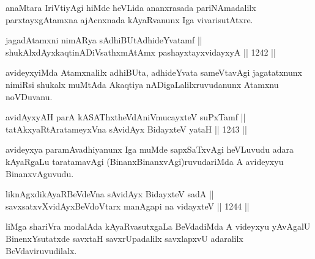 \begin{artha}
anaMtara IriVtiyAgi hiMde heVLida ananxrasada pariNAmadalilx parxtayxgAtamxna ajAcnxnada kAyaRvanunx Iga vivarisutAtxre.
\end{artha}


\begin{shl}
jagadAtamxni nimARya sAdhiBUtAdhideYvatamf || \\
shukAlxdAyxkaqtinADiVsathxmAtAmx pashayxtayxvidayxyA \hfill || 1242 ||  
\end{shl}

\begin{artha}
avideyxyiMda Atamxnalilx adhiBUta, adhideYvata sameVtavAgi jagatatxnunx nimiRsi shukalx muMtAda Akaqtiya nADigaLalilxruvudanunx Atamxnu noVDuvanu.
\end{artha}


\begin{shl}
\footnotemark[1]avidAyxyAH parA kASAThx\s theVdAniVmucayxteV suPxTamf || \\
tatAkxyaRtAratameyxVna sA\s vidAyx BidayxteV yataH \hfill || 1243 ||  
\end{shl}

\begin{artha}
avideyxya paramAvadhiyanunx Iga muMde sapxSaTxvAgi heVLuvudu adara kAyaRgaLu taratamavAgi (BinanxBinanxvAgi)ruvudariMda A avideyxyu BinanxvAguvudu.
\end{artha}


\begin{shl}
liknAgxdikAyaRBeVdeVna sA\s vidAyx BidayxteV sadA || \\
savxsatxvXvidAyxBeVdoV\s tarx manAgapi na vidayxteV \hfill || 1244 ||  
\end{shl}

\begin{artha}
liMga shariVra modalAda kAyaRvasutxgaLa BeVdadiMda A videyxyu yAvAgalU BinenxYsutatxde savxtaH savxrUpadalilx savxlapxvU adaralilx BeVdaviruvudilalx.
\end{artha}

